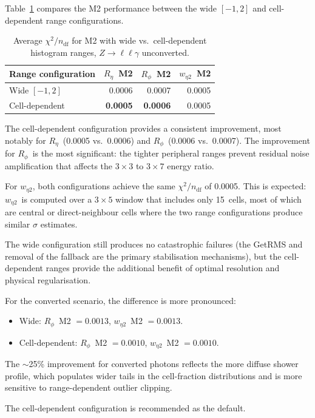 \documentclass[11pt,a4paper]{article}
\newcommand{\Reta}{\ensuremath{R_{\eta}}}
\newcommand{\Rphi}{\ensuremath{R_{\phi}}}
\newcommand{\weta}{\ensuremath{w_{\eta 2}}}
\newcommand{\chisq}{\ensuremath{\chi^2 / n_{\mathrm{df}}}}
\begin{document}
Table~\ref{tab:wide-vs-cellrange} compares the M2 performance
between the wide $[-1, 2]$ and cell-dependent range configurations.

\begin{table}[htbp]
\centering
\caption{Average $\chisq$ for M2 with wide vs.\ cell-dependent
  histogram ranges, $Z \to \ell\ell\gamma$ unconverted.}
\label{tab:wide-vs-cellrange}
\begin{tabular}{lrrr}
\toprule
Range configuration & \Reta\ M2 & \Rphi\ M2 & \weta\ M2 \\
\midrule
Wide $[-1, 2]$     & 0.0006 & 0.0007 & 0.0005 \\
Cell-dependent     & \textbf{0.0005} & \textbf{0.0006} & 0.0005 \\
\bottomrule
\end{tabular}
\end{table}

The cell-dependent configuration provides a consistent improvement,
most notably for \Reta\ (0.0005 vs.\ 0.0006) and \Rphi\ (0.0006 vs.\
0.0007).  The improvement for \Rphi\ is the most significant: the
tighter peripheral ranges prevent residual noise amplification that
affects the $3\!\times\!3$ to $3\!\times\!7$ energy ratio.

For \weta, both configurations achieve the same $\chisq$ of 0.0005.
This is expected: \weta\ is computed over a $3 \times 5$ window that
includes only 15~cells, most of which are central or direct-neighbour
cells where the two range configurations produce similar $\sigma$
estimates.

The wide configuration still produces no catastrophic failures (the
GetRMS and removal of the fallback are the primary stabilisation
mechanisms), but the cell-dependent ranges provide the additional
benefit of optimal resolution and physical regularisation.

For the converted scenario, the difference is more pronounced:
\begin{itemize}
  \item Wide: \Rphi\ M2 $= 0.0013$, \weta\ M2 $= 0.0013$.
  \item Cell-dependent: \Rphi\ M2 $= 0.0010$, \weta\ M2 $= 0.0010$.
\end{itemize}
The $\sim$25\% improvement for converted photons reflects the more
diffuse shower profile, which populates wider tails in the cell-fraction
distributions and is more sensitive to range-dependent outlier clipping.

The cell-dependent configuration is recommended as the default.
\end{document}
